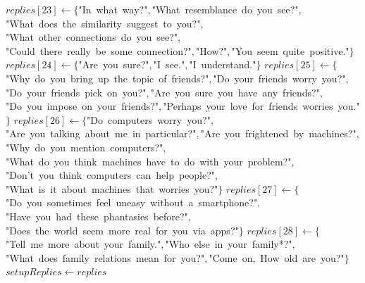 \documentclass[a4paper,10pt]{article}
\begin{document}
\begin{function}
{  \(replies[23]\leftarrow{}\{\)"{}In\ what\ way?"{}\(,\)"{}What\ resemblance\ do\ you\ see?"{}\(,\)"{}What\ does\ the\ similarity\ suggest\ to\ you?"{}\(,\)"{}What\ other\ connections\ do\ you\ see?"{}\(,\)"{}Could\ there\ really\ be\ some\ connection?"{}\(,\)"{}How?"{}\(,\)"{}You\ seem\ quite\ positive."{}\(\}\)\;
  \(replies[24]\leftarrow{}\{\)"{}Are\ you\ sure?"{}\(,\)"{}I\ see."{}\(,\)"{}I\ understand."{}\(\}\)\;
  \(replies[25]\leftarrow{}\{\)"{}Why\ do\ you\ bring\ up\ the\ topic\ of\ friends?"{}\(,\)"{}Do\ your\ friends\ worry\ you?"{}\(,\)"{}Do\ your\ friends\ pick\ on\ you?"{}\(,\)"{}Are\ you\ sure\ you\ have\ any\ friends?"{}\(,\)"{}Do\ you\ impose\ on\ your\ friends?"{}\(,\)"{}Perhaps\ your\ love\ for\ friends\ worries\ you."{}\(\}\)\;
  \(replies[26]\leftarrow{}\{\)"{}Do\ computers\ worry\ you?"{}\(,\)"{}Are\ you\ talking\ about\ me\ in\ particular?"{}\(,\)"{}Are\ you\ frightened\ by\ machines?"{}\(,\)"{}Why\ do\ you\ mention\ computers?"{}\(,\)"{}What\ do\ you\ think\ machines\ have\ to\ do\ with\ your\ problem?"{}\(,\)"{}Don'{}t\ you\ think\ computers\ can\ help\ people?"{}\(,\)"{}What\ is\ it\ about\ machines\ that\ worries\ you?"{}\(\}\)\;
  \(replies[27]\leftarrow{}\{\)"{}Do\ you\ sometimes\ feel\ uneasy\ without\ a\ smartphone?"{}\(,\)"{}Have\ you\ had\ these\ phantasies\ before?"{}\(,\)"{}Does\ the\ world\ seem\ more\ real\ for\ you\ via\ apps?"{}\(\}\)\;
  \(replies[28]\leftarrow{}\{\)"{}Tell\ me\ more\ about\ your\ family."{}\(,\)"{}Who\ else\ in\ your\ family*?"{}\(,\)"{}What\ does\ family\ relations\ mean\ for\ you?"{}\(,\)"{}Come\ on,\ How\ old\ are\ you?"{}\(\}\)\;
  \(setupReplies\leftarrow{}replies\)\;
}
\end{function}


\begin{function}
\caption{checkRepetition(history, newInput)}
\end{function}
\end{document}
